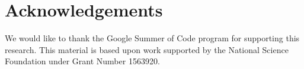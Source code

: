 \section{Acknowledgements}
We would like to thank the Google Summer of Code program for supporting this research. 
%
This material is based upon work supported by the National Science Foundation under Grant Number 1563920.
